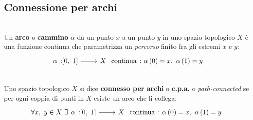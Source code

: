 \subsection{Connessione per archi}
\begin{define}[Arco.]~{}\\
Un \textbf{arco} o \textbf{cammino} $\alpha$ da un punto $x$ a un punto $y$ in uno spazio topologico $X$ è una funzione continua che parametrizza un \textit{percorso} finito fra gli estremi $x$ e $y$:
\begin{equation}
\funz{\alpha}{\left[0,\ 1\right]}{X} \text{ continua}\ \colon \alpha\left(0\right)=x,\ \alpha\left(1\right)=y
\end{equation}
\vspace{-6mm}
\end{define}
\begin{define}~{}\\
Uno spazio topologico $X$ si dice \textbf{connesso per archi} o \textbf{c.p.a.} o \textit{path-connected} se per ogni coppia di punti in $X$ esiste un arco che li collega:
\begin{equation}
\forall x,\ y\in X\ \exists \funz{\alpha}{\left[0,\ 1\right]}{X} \text{ continua}\ \colon \alpha\left(0\right)=x,\ \alpha\left(1\right)=y
\end{equation}
\vspace{-6mm}
\end{define}
\begin{theorema}
\end{theorema}
